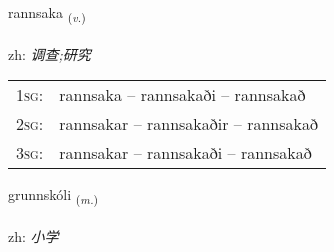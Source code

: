 \documentclass[frontgrid, backgrid]{flacards}\usepackage[]{graphicx}\usepackage[]{color}
\begin{document}
\renewcommand{\flhead}{\vskip5pt \fboxsep=0pt {\small\bfseries\footnotesize Sagnorð | 动词}}
\renewcommand{\fcfoot}{\vskip5pt \fboxsep=0pt \hspace{2pt}{\small\bfseries\footnotesize 2K}}

\renewcommand{\blhead}{\vskip5pt {\small\bfseries\footnotesize Sagnorð | 动词 }}
\renewcommand{\bcfoot}{\vskip5pt \hspace{2pt}{\small\bfseries\footnotesize 2K}}


{rannsaka \small{\textsubscript{(\textit{v.})}} \\[1ex] %
\textphonetic{[ransaka]} \\
zh: \emph{调查;研究} \\  [2ex]
\renewcommand*{\arraystretch}{0.8}
\begin{tabular}{p{1cm}l}
\textsc{1sg}: & rannsaka -- rannsakaði -- rannsakað \\ 
\textsc{2sg}: & rannsakar -- rannsakaðir -- rannsakað \\ 
\textsc{3sg}: & rannsakar -- rannsakaði -- rannsakað \\ 
\end{tabular}
}

\renewcommand{\flhead}{\vskip5pt \fboxsep=0pt {\small\bfseries\footnotesize Nafnorð | 名词}}
\renewcommand{\fcfoot}{\vskip5pt \fboxsep=0pt \hspace{2pt}{\small\bfseries\footnotesize 2K}}

\renewcommand{\blhead}{\vskip5pt {\small\bfseries\footnotesize Nafnorð | 名词 }}
\renewcommand{\bcfoot}{\vskip5pt \hspace{2pt}{\small\bfseries\footnotesize 2K}}


{grunnskóli \small{\textsubscript{(\textit{m.})}} \\[1ex] %
\textphonetic{[krʏnskoulɪ]} \\
zh: \emph{小学} \\  [2ex]
\renewcommand*{\arraystretch}{0.8}
}
\end{document}
